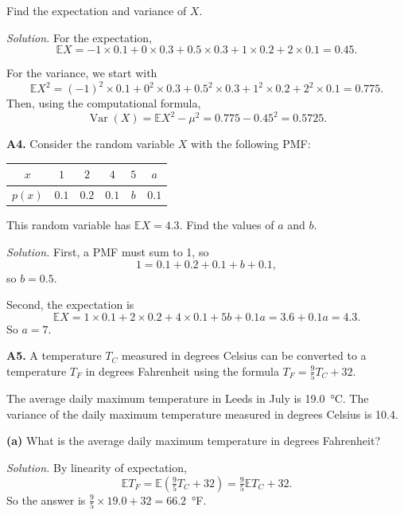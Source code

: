 \documentclass[
  a4paper,
]{book}
\theoremstyle{definition}
\theoremstyle{definition}
\theoremstyle{definition}
\theoremstyle{definition}
\theoremstyle{remark}
\begin{document}
Find the expectation and variance of \(X\).

\begin{myanswers}
\emph{Solution.}
For the expectation,
\[ \mathbb EX = -1\times0.1 + 0\times0.3 + 0.5\times0.3+1\times0.2+2\times0.1 = 0.45. \]

For the variance, we start with
\[ \mathbb EX^2 = (-1)^2\times0.1 + 0^2\times0.3 + 0.5^2\times0.3+1^2\times0.2+2^2\times0.1 = 0.775 . \]
Then, using the computational formula,
\[ \operatorname{Var}(X) = \mathbb EX^2 - \mu^2 = 0.775 - 0.45^2 = 0.5725. \]

\end{myanswers}

\textbf{A4.} Consider the random variable \(X\) with the following PMF:

\begin{longtable}[]{@{}cccccc@{}}
\toprule()
\(x\) & \(1\) & \(2\) & \(4\) & \(5\) & \(a\) \\
\midrule()
\endhead
\(p(x)\) & \(0.1\) & \(0.2\) & \(0.1\) & \(b\) & \(0.1\) \\
\bottomrule()
\end{longtable}

This random variable has \(\mathbb EX = 4.3\). Find the values of \(a\) and \(b\).

\begin{myanswers}
\emph{Solution.}
First, a PMF must sum to 1, so
\[ 1 = 0.1 + 0.2 + 0.1 + b + 0.1 , \]
so \(b = 0.5\).

Second, the expectation is
\[
\mathbb EX = 1\times0.1 + 2 \times 0.2 + 4 \times 0.1 + 5b + 0.1a 
           = 3.6 + 0.1a 
           = 4.3 .
\]
So \(a = 7\).

\end{myanswers}

\textbf{A5.} A temperature \(T_C\) measured in degrees Celsius can be converted to a temperature \(T_F\) in degrees Fahrenheit using the formula \(T_F = \frac95 T_C + 32\).

The average daily maximum temperature in Leeds in July is 19.0~°C. The variance of the daily maximum temperature measured in degrees Celsius is 10.4.

\textbf{(a)} What is the average daily maximum temperature in degrees Fahrenheit?

\begin{myanswers}
\emph{Solution.}
By linearity of expectation,
\[ \mathbb E T_F = \mathbb E\left(\tfrac95T_C + 32\right) = \tfrac95 \mathbb ET_C + 32 . \]
So the answer is \(\frac95 \times 19.0 + 32 = 66.2\)~°F.

\end{myanswers}
\end{document}

